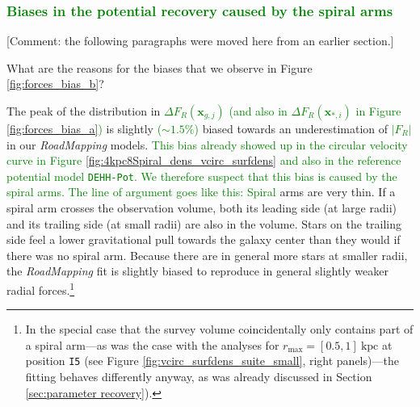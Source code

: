 \documentclass[iop,revtex4,numberedappendix,appendixfloats]{emulateapj}
\newcommand{\vect}[1]{\boldsymbol{#1}}
\newcommand{\RM}{{\sl RoadMapping}}
\newcommand{\NEW}[1]{\textcolor{Green}{#1}}
\newcommand{\OLD}[1]{}
\newcommand{\COMMENT}[1]{\textcolor{ProcessBlue}{#1}}
\begin{document}
\begin{figure}[!htbp]
\label{fig:Fg_vs_R}
\end{figure}


\subsubsection{\NEW{Biases in the potential recovery caused by the spiral arms}} \label{sec:biases_explained}

\COMMENT{[Comment: the following paragraphs were moved here from an earlier section.]}

What are the reasons for the biases that we observe in Figure \OLD{\ref{fig:forces_bias}}\NEW{\ref{fig:forces_bias_b}}? 

The peak of the distribution in \OLD{$\Delta F_R(*_i)$ and} \OLD{$\Delta F_R(g_j)$}\NEW{$\Delta F_R(\vect{x}_{g,j})$} \NEW{(and also in $\Delta F_R(\vect{x}_{*,i})$ in Figure \ref{fig:forces_bias_a})} is slightly \NEW{($\sim1.5\%$)} biased towards an underestimation of \OLD{$|F_{R,M}|$}\NEW{$|F_{R}|$} in our \RM{} models. \NEW{This bias already showed up in the circular velocity curve in Figure \ref{fig:4kpc8Spiral_dens_vcirc_surfdens} and also in the reference potential model \texttt{DEHH-Pot}. We therefore suspect that this bias is caused by the spiral arms. The line of argument goes like this: Spiral}\OLD{We believe the explanation for this to be the fact that spiral} arms are very thin. If a spiral arm crosses the observation volume, both its leading side (at large radii) and its trailing side (at small radii) are also in the volume. Stars on the trailing side feel a lower gravitational pull towards the galaxy center than they would if there was no spiral arm. Because there are in general more stars at smaller radii, the \RM{} fit is slightly biased to reproduce in general slightly weaker radial forces\OLD{ (see also Figures \ref{fig:4kpc8Spiral_vcirc_surfdens} and \ref{fig:4kpc8Spiral_forces})}.\footnote{In the special case that the survey volume coincidentally only contains part of a spiral arm---as was the case with the analyses for $r_\text{max}=[0.5,1]~\text{kpc}$ at position \texttt{I5} (see Figure \ref{fig:vcirc_surfdens_suite_small}, right panels)---the fitting behaves differently anyway, as was already discussed in Section \ref{sec:parameter recovery}).}
\end{document}
